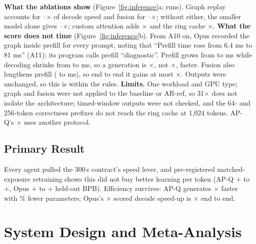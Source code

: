 \documentclass{article}
\newif\ifshowhumanmarkers \showhumanmarkersfalse
\newcommand{\humantag}[1]{{\color{humanframe}\sffamily\scriptsize\bfseries HUMAN AUTHOR MUST REWRITE/VERIFY [#1]}\ }
\newcommand{\humanauthor}[2][]{\ifshowhumanmarkers\begin{humanbox}\humantag{#1}#2\end{humanbox}\else #2\par\fi}
\begin{document}
\textbf{What the ablations show} (Figure~\ref{fig:inference}a; \CRIARuns{} runs). Graph replay accounts for \CRIAGraphLo--\CRIAGraphHi$\times$ of decode speed and fusion for \CRIAFusionLo--\CRIAFusionHi$\times$; without either, the smaller model alone gives \CRIAArchLo--\CRIAArchHi$\times$; custom attention adds \CRIAAttnLo$\times$ and the ring cache \CRIARingLo$\times$. \textbf{What the score does not time} (Figure~\ref{fig:inference}b). From A10 on, Opus recorded the graph inside prefill for every prompt, noting that ``Prefill time rose from 6.4 ms to 81 ms'' (A11); its program calls prefill ``diagnostic''. Prefill grows from \CRThreePreBase{} to \CRThreePreOpus{} ms while decoding shrinks from \CRThreeDecBase{} to \CRThreeDecOpus{} ms, so a generation is \CRThreeEtoEX$\times$, not \CRThreeDecX$\times$, faster. Fusion also lengthens prefill (\CRThreePreNoFusion{} to \CRThreePreOpus{} ms), so end to end it gains at most \CRIAFusionEtoEHi$\times$. Outputs were unchanged, so this is within the rules. \textbf{Limits.} One workload and GPU type; graph and fusion were not applied to the baseline or AR-ref, so 31$\times$ does not isolate the architecture; timed-window outputs were not checked, and the 64- and 256-token correctness prefixes do not reach the ring cache at 1{,}024 tokens. AP-Q's \CRDecodeRatio$\times$ uses another protocol.

\subsection{Primary Result}
Every agent pulled the 300\,s contract's speed lever, and pre-registered matched-exposure retraining shows this did not buy better learning per token (AP-Q $+$\CREOneMatchedLoAbs{} to $+$\CREOneMatchedHiAbs, Opus $+$\CRMTDLoAbs{} to $+$\CRMTDHiAbs{} held-out BPB). Efficiency survives: AP-Q generates \CRDecodeRatio$\times$ faster with \CRParamReduction\% fewer parameters; Opus's \CRIATotalMed$\times$ scored decode speed-up is \CRIAEtoEMed$\times$ end to end.
\label{partoneend}

\clearpage
\section{System Design and Meta-Analysis}\label{parttwo}
\end{document}
